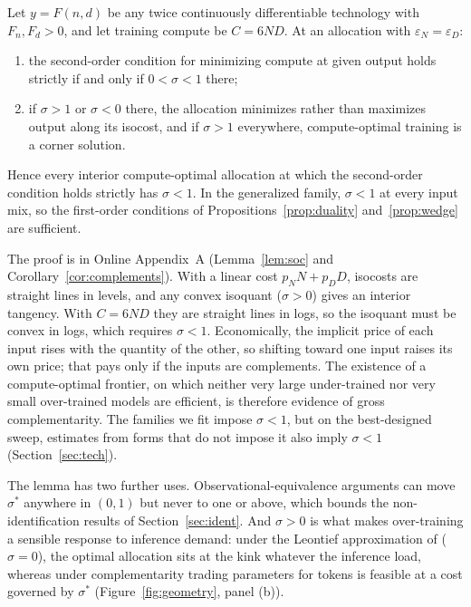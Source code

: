 \begin{lemma}\label{lemma:sigma}
Let $y=F(n,d)$ be any twice continuously differentiable technology with $F_n,F_d>0$, and let training compute be
$C=6ND$. At an allocation with $\varepsilon_N=\varepsilon_D$:
\begin{enumerate}
\item[(i)] the second-order condition for minimizing compute at given output holds strictly if and only if
$0<\sigma<1$ there;
\item[(ii)] if $\sigma>1$ or $\sigma<0$ there, the allocation minimizes rather than maximizes output along its
isocost, and if $\sigma>1$ everywhere, compute-optimal training is a corner solution.
\end{enumerate}
Hence every interior compute-optimal allocation at which the second-order condition holds strictly has $\sigma<1$.
In the generalized family, $\sigma<1$ at every input mix, so the first-order conditions of
Propositions~\ref{prop:duality} and~\ref{prop:wedge} are sufficient.
\end{lemma}

\noindent The proof is in Online Appendix~A (Lemma~\ref{lem:soc} and Corollary~\ref{cor:complements}). With a linear
cost $p_NN+p_DD$, isocosts are straight lines in levels, and any convex isoquant ($\sigma>0$) gives an interior
tangency. With $C=6ND$ they are straight lines in logs, so the isoquant must be convex in logs, which requires
$\sigma<1$. Economically, the implicit price of each input rises with the quantity of the other, so shifting toward
one input raises its own price; that pays only if the inputs are complements. The existence of a compute-optimal
frontier, on which neither very large under-trained nor very small over-trained models are efficient, is therefore
evidence of gross complementarity. The families we fit impose $\sigma<1$, but on the
best-designed sweep, estimates from forms that do not impose it also imply $\sigma<1$ (Section~\ref{sec:tech}).

The lemma has two further uses. Observational-equivalence arguments can move $\sigma^*$ anywhere in $(0,1)$ but
never to one or above, which bounds the non-identification results of Section~\ref{sec:ident}. And $\sigma>0$ is what
makes over-training a sensible response to inference demand: under the Leontief approximation of
\citet{hao2026theory} ($\sigma=0$), the optimal allocation sits at the kink whatever the inference load, whereas under
complementarity trading parameters for tokens is feasible at a cost governed by $\sigma^*$ (Figure~\ref{fig:geometry},
panel (b)).

